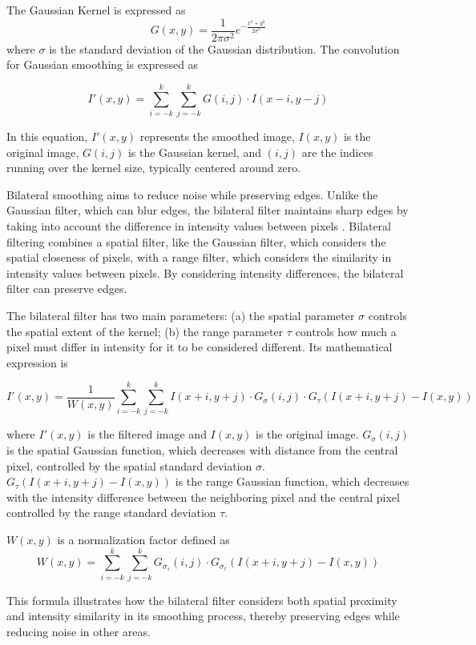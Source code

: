 \documentclass[
  shortnames]{jss}
\begin{document}
The Gaussian Kernel is expressed as
\begin{equation}
   G(x, y) = \frac{1}{2\pi\sigma^2} e^{-\frac{x^2 + y^2}{2\sigma^2}}
\end{equation}
where \(\sigma\) is the standard deviation of the Gaussian distribution. The convolution for Gaussian smoothing is expressed as

\begin{equation}
   I'(x, y) = \sum_{i=-k}^{k} \sum_{j=-k}^{k} G(i, j) \cdot I(x - i, y - j)
\end{equation}

In this equation, \(I'(x, y)\) represents the smoothed image, \(I(x, y)\) is the original image, \(G(i, j)\) is the Gaussian kernel, and \((i,j)\) are the indices running over the kernel size, typically centered around zero.

Bilateral smoothing aims to reduce noise while preserving edges. Unlike the Gaussian filter, which can blur edges, the bilateral filter maintains sharp edges by taking into account the difference in intensity values between pixels \citep{Tomasi1998}. Bilateral filtering combines a spatial filter, like the Gaussian filter, which considers the spatial closeness of pixels, with a range filter, which considers the similarity in intensity values between pixels. By considering intensity differences, the bilateral filter can preserve edges.

The bilateral filter has two main parameters: (a) the spatial parameter \(\sigma\) controls the spatial extent of the kernel; (b) the range parameter \(\tau\) controls how much a pixel must differ in intensity for it to be considered different. Its mathematical expression is

\begin{equation}
I'(x, y) = \frac{1}{W(x, y)} \sum_{i=-k}^{k} \sum_{j=-k}^{k} I(x + i, y + j) \cdot G_{\sigma}(i, j) \cdot G_{\tau}(I(x + i, y + j) - I(x, y))
\end{equation}

where \(I'(x,y)\) is the filtered image and \(I(x,y)\) is the original image. \(G_{\sigma}(i, j)\) is the spatial Gaussian function, which decreases with distance from the central pixel, controlled by the spatial standard deviation \(\sigma\). \(G_{\tau}(I(x + i, y + j) - I(x, y))\) is the range Gaussian function, which decreases with the intensity difference between the neighboring pixel and the central pixel controlled by the range standard deviation \(\tau\).

\(W(x, y)\) is a normalization factor defined as
\begin{equation}
W(x, y) = \sum_{i=-k}^{k} \sum_{j=-k}^{k} G_{\sigma_s}(i, j) \cdot G_{\sigma_r}(I(x + i, y + j) - I(x, y))
\end{equation}

This formula illustrates how the bilateral filter considers both spatial proximity and intensity similarity in its smoothing process, thereby preserving edges while reducing noise in other areas.

\renewcommand\refname{Conclusion}

\end{document}
